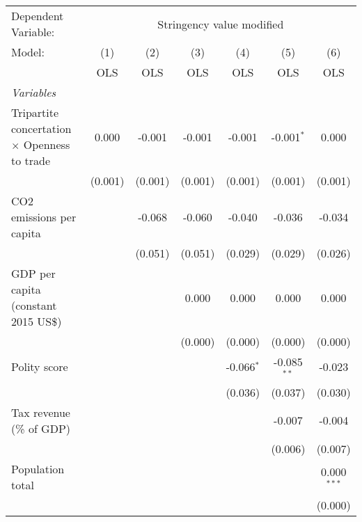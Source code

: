 
\begingroup
\centering
\begin{tabular}{lcccccc}
   \toprule
   Dependent Variable: & \multicolumn{6}{c}{Stringency value modified}\\
   Model:                                              & (1)     & (2)     & (3)     & (4)          & (5)           & (6)\\  
                                                       &  OLS    & OLS     & OLS     & OLS          & OLS           & OLS\\  
   \midrule
   \emph{Variables}\\
   Tripartite concertation $\times$ Openness to trade  & 0.000   & -0.001  & -0.001  & -0.001       & -0.001$^{*}$  & 0.000\\   
                                                       & (0.001) & (0.001) & (0.001) & (0.001)      & (0.001)       & (0.001)\\   
   CO2 emissions per capita                            &         & -0.068  & -0.060  & -0.040       & -0.036        & -0.034\\   
                                                       &         & (0.051) & (0.051) & (0.029)      & (0.029)       & (0.026)\\   
   GDP per capita (constant 2015 US\$)                 &         &         & 0.000   & 0.000        & 0.000         & 0.000\\   
                                                       &         &         & (0.000) & (0.000)      & (0.000)       & (0.000)\\   
   Polity score                                        &         &         &         & -0.066$^{*}$ & -0.085$^{**}$ & -0.023\\   
                                                       &         &         &         & (0.036)      & (0.037)       & (0.030)\\   
   Tax revenue (\% of GDP)                             &         &         &         &              & -0.007        & -0.004\\   
                                                       &         &         &         &              & (0.006)       & (0.007)\\   
   Population total                                    &         &         &         &              &               & 0.000$^{***}$\\   
                                                       &         &         &         &              &               & (0.000)\\   

\end{tabular}

